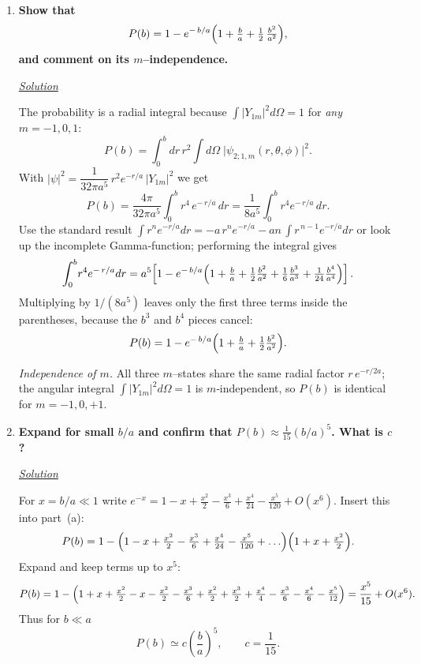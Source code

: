 \documentclass[12pt]{article}
\begin{document}
\begin{enumerate}[label=\textbf{\alph*)},leftmargin=0.9cm]

\item \textbf{Show that}
\[
P(b)=1-e^{-\,b/a}\Bigl(1+\tfrac{b}{a}+\tfrac12\,\tfrac{b^{2}}{a^{2}}\Bigr),
\]
\textbf{and comment on its $m$–independence.}

\medskip
\underline{\emph{Solution}}

The probability is a radial integral because
\(\int|Y_{1m}|^{2}d\Omega=1\) for \emph{any} $m=-1,0,1$:
\[
P(b)=\int_{0}^{b}\!dr\,r^{2}\!\int d\Omega\;
\bigl|\psi_{2;1,m}(r,\theta,\phi)\bigr|^{2}.
\]
With \(|\psi|^{2}=\dfrac{1}{32\pi a^{5}}\,
r^{2}e^{-r/a}\,|Y_{1m}|^{2}\) we get
\[
P(b)=\frac{4\pi}{32\pi a^{5}}\int_{0}^{b}\! r^{4}\,e^{-\,r/a}\,dr
      =\frac{1}{8a^{5}}\int_{0}^{b} r^{4}e^{-\,r/a}\,dr.
\]
Use the standard result
\(
\displaystyle\int r^{n}e^{-r/a}dr
        =-a\,r^{n}e^{-r/a}-an\,\int r^{\,n-1}e^{-r/a}dr
\)
or look up the incomplete Gamma‑function; performing the integral gives
\[
\int_{0}^{b}\! r^{4}e^{-\,r/a}dr
   =a^{5}\!\left[1-e^{-\,b/a}\Bigl(1+\tfrac{b}{a}
                                    +\tfrac12\tfrac{b^{2}}{a^{2}}
                                    +\tfrac16\tfrac{b^{3}}{a^{3}}
                                    +\tfrac1{24}\tfrac{b^{4}}{a^{4}}\Bigr)\right].
\]
Multiplying by $1/(8a^{5})$ leaves only the first three terms inside the
parentheses, because the $b^{3}$ and $b^{4}$ pieces cancel:
\[
P(b)=1-e^{-\,b/a}\Bigl(1+\tfrac{b}{a}+\tfrac12\tfrac{b^{2}}{a^{2}}\Bigr).
\]

\emph{Independence of $m$.}  All three $m$–states share the same radial
factor \(r\,e^{-r/2a}\); the angular integral \(\int|Y_{1m}|^{2}d\Omega=1\) is
$m$‑independent, so \(P(b)\) is identical for \(m=-1,0,+1\).

\item \textbf{Expand for small $b/a$ and confirm that
\(\displaystyle P(b)\approx \tfrac1{15}(b/a)^{5}\).  What is $c$?}

\medskip
\underline{\emph{Solution}}

For \(x=b/a\ll1\) write
\(e^{-x}=1-x+\tfrac{x^{2}}{2}-\tfrac{x^{3}}{6}
        +\tfrac{x^{4}}{24}-\tfrac{x^{5}}{120}+O(x^{6})\).
Insert this into part (a):
\[
P(b)=1-\Bigl(1-x+\tfrac{x^{2}}{2}-\tfrac{x^{3}}{6}
              +\tfrac{x^{4}}{24}-\tfrac{x^{5}}{120}+\ldots\Bigr)
           \Bigl(1+x+\tfrac{x^{2}}{2}\Bigr).
\]
Expand and keep terms up to \(x^{5}\):
\[
P(b)=1-\Bigl(1+x+\tfrac{x^{2}}{2}
             -x-\tfrac{x^{2}}{2}-\tfrac{x^{3}}{6}
             +\tfrac{x^{2}}{2}+\tfrac{x^{3}}{2}+\tfrac{x^{4}}{4}
             -\tfrac{x^{3}}{6}-\tfrac{x^{4}}{6}-\tfrac{x^{5}}{12}\Bigr)
     =\frac{x^{5}}{15}+O(x^{6}).
\]
Thus for \(b\ll a\)
\[
\boxed{P(b)\simeq c\left(\frac{b}{a}\right)^{5}},
\qquad c=\frac{1}{15}.
\]

\end{enumerate}
\end{document}
